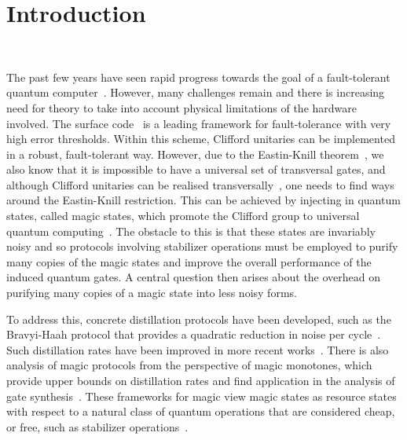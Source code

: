 \documentclass[pra,
aps,
twocolumn,
superscriptaddress,
groupedaddress,
nofootinbib,
reprint
]{revtex4-1}
\begin{document}
\section{Introduction}
\label{sec:intro}

~\cite{White_2021, Rethinasamy_2020, Blackwell_1953, Sarkar_2020, Gour_2020}

The past few years have seen rapid progress towards the goal of a fault-tolerant quantum computer~\cite{Nickerson_2014, Nikahd_2017, chao_2018, lin_pieceable_2020, Lin_2020, Bourassa_2021}. However, many challenges remain and there is increasing need for theory to take into account physical limitations of the hardware involved. The surface code~\cite{Bravyi_1998, Freedman_2001, Dennis_2002, Raussendorf_2007} is a leading framework for fault-tolerance with very high error thresholds. Within this scheme, Clifford unitaries can be implemented in a robust, fault-tolerant way. However, due to the Eastin-Knill theorem~\cite{Eastin_2009}, we also know that it is impossible to have a universal set of transversal gates, and although Clifford unitaries can be realised transversally~\cite{Calderbank_1996, Steane_1996}, one needs to find ways around the Eastin-Knill restriction. This can be achieved by injecting in quantum states, called magic states, which promote the Clifford group to universal quantum computing~\cite{cit:bravyi}. The obstacle to this is that these states are invariably noisy and so protocols involving stabilizer operations must be employed to purify many copies of the magic states and improve the overall performance of the induced quantum gates. A central question then arises about the overhead on purifying many copies of a magic state into less noisy forms. 

To address this, concrete distillation protocols have been developed, such as the Bravyi-Haah protocol that provides a quadratic reduction in noise per cycle~\cite{Bravyi2012}. Such distillation rates have been improved in more recent works~\cite{Hastings2018, Litinski_2019, Krishna2019, cit:prakash}. There is also analysis of magic protocols from the perspective of magic monotones, which provide upper bounds on distillation rates and find application in the analysis of gate synthesis~\cite{Campbell_2017, Howard_2017, Prakash_2018}. These frameworks for magic view magic states as resource states with respect to a natural class of quantum operations that are considered cheap, or free, such as stabilizer operations~\cite{Gour_2019, cit:ahmadi, cit:seddon, Wang_2019}.
  
\end{document}
